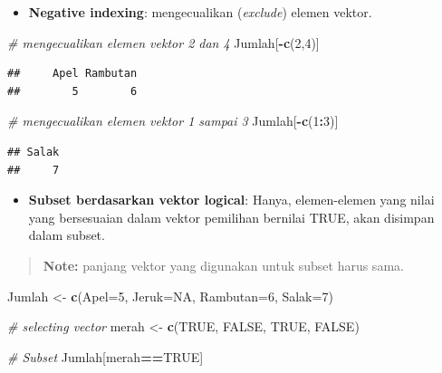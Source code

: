 \documentclass[]{book}
\newenvironment{Shaded}{\begin{snugshade}}{\end{snugshade}}
\newcommand{\KeywordTok}[1]{\textcolor[rgb]{0.13,0.29,0.53}{\textbf{#1}}}
\newcommand{\DataTypeTok}[1]{\textcolor[rgb]{0.13,0.29,0.53}{#1}}
\newcommand{\DecValTok}[1]{\textcolor[rgb]{0.00,0.00,0.81}{#1}}
\newcommand{\StringTok}[1]{\textcolor[rgb]{0.31,0.60,0.02}{#1}}
\newcommand{\CommentTok}[1]{\textcolor[rgb]{0.56,0.35,0.01}{\textit{#1}}}
\newcommand{\OtherTok}[1]{\textcolor[rgb]{0.56,0.35,0.01}{#1}}
\newcommand{\OperatorTok}[1]{\textcolor[rgb]{0.81,0.36,0.00}{\textbf{#1}}}
\newcommand{\NormalTok}[1]{#1}
\providecommand{\tightlist}{%
  \setlength{\itemsep}{0pt}\setlength{\parskip}{0pt}}
\begin{document}
\begin{itemize}
\tightlist
\item
  \textbf{Negative indexing}: mengecualikan (\emph{exclude}) elemen
  vektor.
\end{itemize}

\begin{Shaded}
\begin{Highlighting}[]
\CommentTok{# mengecualikan elemen vektor 2 dan 4}
\NormalTok{Jumlah[}\OperatorTok{-}\KeywordTok{c}\NormalTok{(}\DecValTok{2}\NormalTok{,}\DecValTok{4}\NormalTok{)]}
\end{Highlighting}
\end{Shaded}

\begin{verbatim}
##     Apel Rambutan 
##        5        6
\end{verbatim}

\begin{Shaded}
\begin{Highlighting}[]
\CommentTok{# mengecualikan elemen vektor 1 sampai 3}
\NormalTok{Jumlah[}\OperatorTok{-}\KeywordTok{c}\NormalTok{(}\DecValTok{1}\OperatorTok{:}\DecValTok{3}\NormalTok{)]}
\end{Highlighting}
\end{Shaded}

\begin{verbatim}
## Salak 
##     7
\end{verbatim}

\begin{itemize}
\tightlist
\item
  \textbf{Subset berdasarkan vektor logical}: Hanya, elemen-elemen yang
  nilai yang bersesuaian dalam vektor pemilihan bernilai TRUE, akan
  disimpan dalam subset.
\end{itemize}

\begin{quote}
\textbf{Note: } panjang vektor yang digunakan untuk subset harus sama.
\end{quote}

\begin{Shaded}
\begin{Highlighting}[]
\NormalTok{Jumlah <-}\StringTok{ }\KeywordTok{c}\NormalTok{(}\DataTypeTok{Apel=}\DecValTok{5}\NormalTok{, }\DataTypeTok{Jeruk=}\OtherTok{NA}\NormalTok{, }\DataTypeTok{Rambutan=}\DecValTok{6}\NormalTok{, }\DataTypeTok{Salak=}\DecValTok{7}\NormalTok{)}

\CommentTok{# selecting vector}
\NormalTok{merah <-}\StringTok{ }\KeywordTok{c}\NormalTok{(}\OtherTok{TRUE}\NormalTok{, }\OtherTok{FALSE}\NormalTok{, }\OtherTok{TRUE}\NormalTok{, }\OtherTok{FALSE}\NormalTok{)}

\CommentTok{# Subset}
\NormalTok{Jumlah[merah}\OperatorTok{==}\OtherTok{TRUE}\NormalTok{]}
\end{Highlighting}
\end{Shaded}
\end{document}
